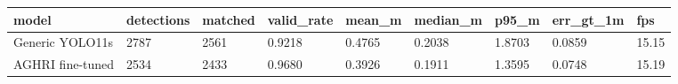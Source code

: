 \begin{tabular}{lllllllll}
 \toprule
model & detections & matched & valid_rate & mean_m & median_m & p95_m & err_gt_1m & fps \\
 \midrule
Generic YOLO11s & 2787 & 2561 & 0.9218 & 0.4765 & 0.2038 & 1.8703 & 0.0859 & 15.15 \\
AGHRI fine-tuned & 2534 & 2433 & 0.9680 & 0.3926 & 0.1911 & 1.3595 & 0.0748 & 15.19 \\
 \bottomrule
\end{tabular}
